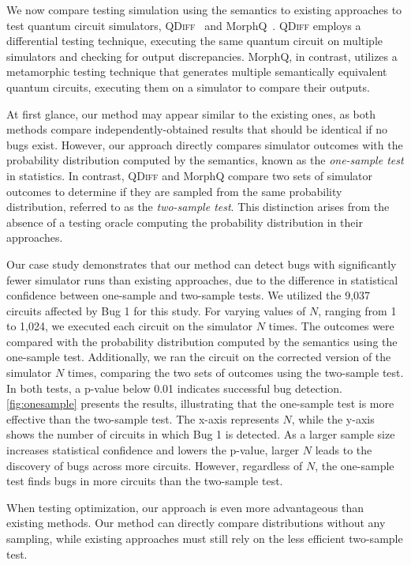We now compare testing simulation using the semantics to existing approaches to
test quantum circuit simulators, \textsc{QDiff}~\cite{wang2022qdiff} and
MorphQ~\cite{paltenghi2023morphq}.
%
\textsc{QDiff} employs a differential testing technique, executing the same
quantum circuit on multiple simulators and checking for output discrepancies.
%
MorphQ, in contrast, utilizes a metamorphic testing technique that generates
multiple semantically equivalent quantum circuits, executing them on a
simulator to compare their outputs.

At first glance, our method may appear similar to the existing ones, as both
methods compare independently-obtained results that should be identical if no
bugs exist.
%
However, our approach directly compares simulator outcomes with the probability
distribution computed by the semantics, known as the \emph{one-sample test} in
statistics.
%
In contrast, \textsc{QDiff} and MorphQ compare two sets of simulator outcomes
to determine if they are sampled from the same probability distribution,
referred to as the \emph{two-sample test}.
%
This distinction arises from the absence of a testing oracle computing the
probability distribution in their approaches.

Our case study demonstrates that our method can detect bugs with significantly
fewer simulator runs than existing approaches, due to the difference in
statistical confidence between one-sample and two-sample tests.
%
We utilized the 9,037 circuits affected by Bug 1 for this study.
%
For varying values of $N$, ranging from 1 to 1,024, we executed each circuit on
the simulator $N$ times.
%
The outcomes were compared with the probability distribution computed by the
semantics using the one-sample test.
%
Additionally, we ran the circuit on the corrected version of the simulator $N$
times, comparing the two sets of outcomes using the two-sample test.
%
In both tests, a p-value below 0.01 indicates successful bug detection.
%
\cref{fig:onesample} presents the results, illustrating that the one-sample test
is more effective than the two-sample test.
%
The x-axis represents $N$, while the y-axis shows the number of circuits in
which Bug 1 is detected.
%
As a larger sample size increases statistical confidence and lowers the
p-value, larger $N$ leads to the discovery of bugs across more circuits.
%
However, regardless of $N$, the one-sample test finds bugs in more circuits
than the two-sample test.

When testing optimization, our approach is even more advantageous than existing
methods.
%
Our method can directly compare distributions without any sampling, while
existing approaches must still rely on the less efficient two-sample test.

